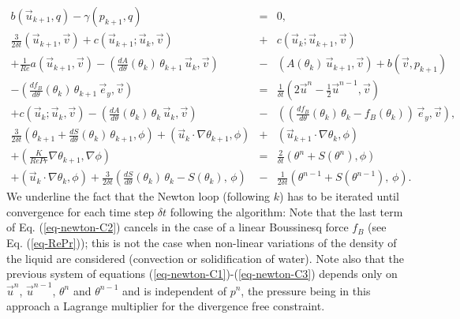 \begingroup \small{
	\begin{eqnarray} \label{eq-newton-C1}
	b\left(\vec{u}_{k+1}, q\right) - \gamma (p_{k+1},q) &=& 0, \\ %
	\frac{3}{2 \delta t} \left(\vec{u}_{k+1},\vec{v}\right)
	+ c\left(\vec{u}_{k+1} ; \vec{u}_{k}, \vec{v} \right)
	&+& c\left(\vec{u}_{k} ; \vec{u}_{k+1}, \vec{v} \right)\\ \nonumber
	+ 
	\frac{1}{Re} a\left( \vec{u}_{k+1}, \vec{v}\right)
	- \left(\frac{d A}{d\theta}(\theta_k)\, \theta_{k+1} \, \vec{u}_k, \vec{v}\right)
	&-& \left(A(\theta_k) \, \vec{u}_{k+1}, \vec{v}\right) + b\left(\vec{v}, p_{k+1}\right)  \\  \nonumber
	- {\left(\frac{df_B}{d\theta}(\theta_k)\, \theta_{k+1} \, \vec{e}_y, \vec{v}\right)} &=&  
	\frac{1}{\delta t} \left( 2 \vec{u}^n - \frac{1}{2} \vec{u}^{n-1},\vec{v}\right) \\ \label{eq-newton-C2} \nonumber
	+ c\left(\vec{u}_k ; \vec{u}_{k}, \vec{v} \right) - \left(\frac{d A}{d\theta}(\theta_k)\, \theta_{k} \, \vec{u}_k, \vec{v}\right)
	&-& \left( \left(\frac{df_B}{d\theta}(\theta_k)\, \theta_{k} - f_B(\theta_k)\right)\, \vec{e}_y,\vec{v}\right), \,\,\, \\   %
	\frac{3}{2\delta t} \left(\theta_{k+1} + \frac{dS}{d\theta}(\theta_k)\, \theta_{k+1}, \phi\right)
	+\left(\vec{u}_{k} \cdot \nabla \theta_{k+1} , \phi  \right)
	&+& \left( \vec{u}_{k+1} \cdot \nabla  \theta_k , \phi \right) \\ \nonumber
	+ \left( \frac{K}{Re Pr} \nabla \theta_{k+1}, \nabla \phi \right) 
	&=&
	\frac{2}{\delta t} \left(\theta^n + S(\theta^n) , \phi\right)  \\ \label{eq-newton-C3} \nonumber
	+\left(\vec{u}_{k} \cdot \nabla  \theta_k, \phi \right)
	+ \frac{3}{2 \delta t} \left(\frac{dS}{d\theta}(\theta_k)\, \theta_{k}  - S(\theta_k),\, \phi\right) 
	&-& \frac{1}{2 \delta t} \left(\theta^{n-1} + S(\theta^{n-1}),\, \phi\right).\,\,\,
	\end{eqnarray}
} \endgroup
We underline the fact that the Newton loop (following $k$) has to be iterated until convergence for each time step $\delta t$ following the algorithm:
Note that the last term of Eq. (\ref{eq-newton-C2}) cancels in the case of a linear Boussinesq force $f_B$  (see Eq. (\ref{eq-RePr})); this is not the case when non-linear variations of the density of the liquid are considered (convection or solidification of water).  Note also that the previous system of equations (\ref{eq-newton-C1})-(\ref{eq-newton-C3}) depends only on $\vec{u}^n$, $\vec{u}^{n-1}$, $\theta^n$ and $\theta^{n-1}$ and is independent of $p^n$, the pressure being in this approach a Lagrange multiplier for the divergence free constraint. 

